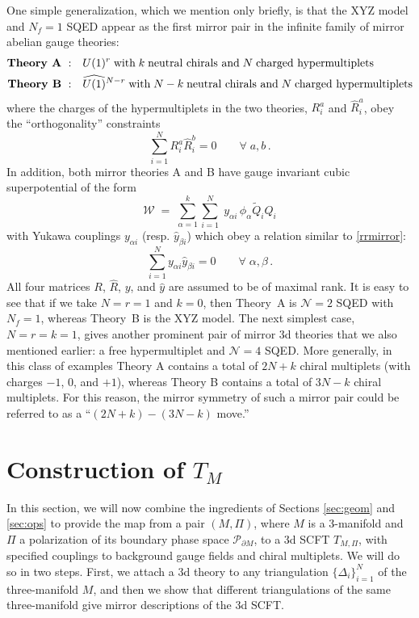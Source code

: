 \documentclass[hyper,letterpaper]{JHEP3}
\numberwithin{equation}{section}
\newcommand{\be}{\begin{equation}}
\newcommand{\ee}{\end{equation}}
\newcommand{\pd}{\partial}
\newcommand{\CN}{\mathcal{N}}
\newcommand{\CP}{\mathcal{P}}
\newcommand{\CW}{\mathcal{W}}
\begin{document}
One simple generalization, which we mention only briefly, is that the XYZ model and $N_f=1$ SQED appear as the first mirror pair in the infinite family of mirror abelian gauge theories:
\begin{align} 
\text{\bf Theory A}~: & \quad U(1)^r \; \text{with} \; k \; \text{neutral chirals and} \; N \; \text{charged hypermultiplets} \label{mirrorR} \\
\text{\bf Theory B}~: & \quad \widehat{U(1)}{}^{N-r} \; \text{with} \; N-k \; \text{neutral chirals and} \; N \; \text{charged hypermultiplets} \notag 
\end{align}
where the charges of the hypermultiplets in the two theories, $R_i^a$ and $\widehat R_i^a$,
obey the ``orthogonality'' constraints
\be
\sum_{i=1}^N R_i^a \widehat R_i^b = 0 \qquad \forall \; a, b \,.
\label{rrmirror}
\ee
In addition, both mirror theories A and B have gauge invariant cubic superpotential of the form
\be
\CW \; = \; \sum_{\alpha=1}^k \sum_{i=1}^N \; y_{\alpha i} \, \phi_{\alpha} \tilde Q_i Q_i
\ee
with Yukawa couplings $y_{\alpha i}$ (resp. $\widehat{y}_{\beta i}$) which obey a relation similar to \eqref{rrmirror}:
\be
\sum_{i=1}^N y_{\alpha i} \widehat{y}_{\beta i} = 0 \qquad \forall \; \alpha, \beta \,.
\ee
All four matrices $R$, $\widehat{R}$, $y$, and $\widehat{y}$ are assumed to be of maximal rank.
It is easy to see that if we take $N=r=1$ and $k=0$, then Theory~A is $\CN=2$ SQED with $N_f=1$, whereas Theory~B is the XYZ model.
The next simplest case, $N=r=k=1$, gives another prominent pair of mirror 3d theories that we also mentioned earlier:
a free hypermultiplet and $\CN=4$ SQED.
More generally, in this class of examples Theory A contains a total of $2N+k$ chiral multiplets (with charges $-1$, $0$, and $+1$),
whereas Theory B contains a total of $3N-k$ chiral multiplets. For this reason, the mirror symmetry of such a mirror pair could be
referred to as a ``$(2N+k)-(3N-k)$ move.''





\section{Construction of $T_M$}
\label{sec:glue}

In this section, we will now combine the ingredients of Sections \ref{sec:geom} and \ref{sec:ops} to provide the map from a pair $(M,\Pi)$, where $M$ is a 3-manifold and $\Pi$ a polarization of its boundary phase space $\CP_{\pd M}$, to a 3d SCFT $T_{M,\Pi}$, with specified couplings to background gauge fields and chiral multiplets. We will do so in two steps. First, we attach a 3d theory to any triangulation $\{\Delta_i\}_{i=1}^N$ of the three-manifold $M$,
and then we show that different triangulations of the same three-manifold give mirror descriptions of the 3d SCFT.
\end{document}
